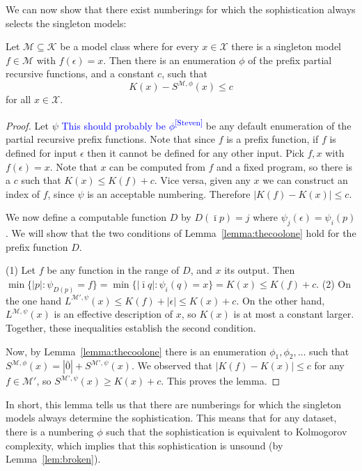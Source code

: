 \documentclass{style/llncs}
\newcommand{\M}{\mathscr M}
\newcommand{\K}{\mathscr K}
\newcommand{\X}{\mathscr X}
\newcommand{\sdr}[1]{\textcolor{blue}{\small #1\textsuperscript{[Steven]} }}
\begin{document}
We can now show that there exist numberings for which the sophistication always selects the singleton models:

\begin{lemma}[Overfitting]
Let $\M \subseteq \K$ be a model class where for every $x\in\X$ there is a singleton model $f\in\M$ with $f(\epsilon)=x$. Then there is an enumeration $\phi$ of the prefix partial recursive functions, and a constant $c$, such that
\[
K(x)-S^{\M,\phi}(x)\le c
\]
for all $x\in\X$.
\end{lemma}
\begin{proof}
Let $\psi$ \sdr{This should probably be $\phi$} be any default enumeration of the partial recursive prefix functions. Note that since $f$ is a prefix function, if $f$ is defined for input $\epsilon$ then it cannot be defined for any other input. Pick $f,x$ with $f(\epsilon)=x$. Note that $x$ can be computed from $f$ and a fixed program, so there is a $c$ such that $K(x)\le K(f)+c$. Vice versa, given any $x$ we can construct an index of $f$, since $\psi$ is an acceptable numbering. Therefore $|K(f)-K(x)|\le c$.

We now define a computable function $D$ by $D(\bar\imath p)=j$ where $\psi_j(\epsilon) = \psi_i(p)$.  We will show that the two conditions of Lemma~\ref{lemma:thecoolone} hold for the prefix function $D$.

(1) Let $f$ be any function in the range of $D$, and $x$ its output. Then $\min\{|p|:\psi_{D(p)}=f\}=\min\{|\bar\imath q|:\psi_i(q)=x\}=K(x)\le K(f)+c$. (2) On the one hand $L^{\M',\psi}(x)\le K(f)+|\epsilon|\le K(x)+c$. On the other hand, $L^{\M,\psi}(x)$ is an effective description of $x$, so $K(x)$ is at most a constant larger. Together, these inequalities establish the second condition.

Now, by Lemma~\ref{lemma:thecoolone} there is an enumeration $\phi_1,\phi_2,\ldots$ such that $S^{\M,\phi}(x)=|\bar 0|+S^{\M',\psi}(x)$. We observed that $|K(f)-K(x)|\le c$ for any $f\in\M'$, so $S^{\M',\psi}(x)\ge K(x)+c$. This proves the lemma.
\end{proof}

In short, this lemma tells us that there are numberings for which the singleton models always determine the sophistication. This means that for any dataset, there is a numbering $\phi$ such that the sophistication is equivalent to Kolmogorov complexity, which implies that this sophistication is unsound (by Lemma~\ref{lem:broken}).
\end{document}
